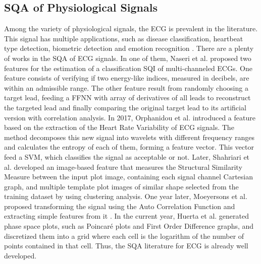 \subsection{\gls{SQA} of Physiological Signals}

Among the variety of physiological signals, the \gls{ECG} is prevalent in the literature. This signal has multiple applications, such as disease classification, heartbeat type detection, biometric detection and emotion recognition \cite{ecg-1}. There are a plenty of works in the \gls{SQA} of ECG signals. In one of them, Naseri et al. \cite{ecg-2} proposed two features for the estimation of a classification \gls{SQI} of multi-channeled \gls{ECG}s. One feature consists of verifying if two energy-like indices, measured in decibels, are within an admissible range. The other feature result from randomly choosing a target lead, feeding a \gls{FFNN} with array of derivatives of all leads to reconstruct the targeted lead and finally comparing the original target lead to its artificial version with correlation analysis. In 2017, Orphanidou et al. \cite{ecg-3} introduced a feature based on the extraction of the Heart Rate Variability of \gls{ECG} signals. The method decomposes this new signal into wavelets with different frequency ranges and calculates the entropy of each of them, forming a feature vector. This vector feed a \gls{SVM}, which classifies the signal as acceptable or not. Later, Shahriari et al. \cite{ecg-4} developed an image-based feature that measures the Structural Similarity Measure between the input plot image, containing each signal channel Cartesian graph, and multiple template plot images of similar shape selected from the training dataset by using clustering analysis. One year later, Moeyersons et al. \cite{ecg-5} proposed transforming the signal using the Auto Correlation Function and extracting simple features from it \cite{ecg-5}. In the current year, Huerta et al. \cite{ecg-6} generated phase space plots, such as Poincaré plots and First Order Difference graphs, and discretized them into a grid where each cell is the logarithm of the number of points contained in that cell. Thus, the \gls{SQA} literature for \gls{ECG} is already well developed.

